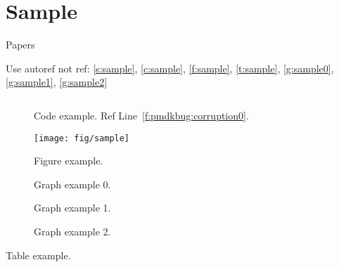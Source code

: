 \section{Sample}
\label{s:sample}

Papers~\cite{logfreeds-david-atc18, whisper-nalli-asplos17}

Use autoref not ref: \autoref{s:sample}, \autoref{c:sample},
\autoref{f:sample}, \autoref{t:sample}, \autoref{g:sample0},
\autoref{g:sample1}, \autoref{g:sample2}

\begin{figure}[t]
  \noindent
  \centering
  \inputminted[xleftmargin=11pt,fontsize=\scriptsize,linenos,escapeinside=@@]{c}{code/sample.c}
  \caption{
    Code example. Ref Line~\ref{f:pmdkbug:corruption0}.
  }
  \label{c:sample}
\end{figure}

\begin{figure}[t!]
  \centering
  \texttt{[image: fig/sample]}
  \caption{Figure example. }
  \label{f:sample}
\end{figure}

\begin{figure*}
  \centering
  
  \caption{
    Graph example 0.
  }
  \label{g:sample0}
\end{figure*}

\begin{figure}
  \centering
  
  \caption{
    Graph example 1.
  }
  \label{g:sample1}
\end{figure}

\begin{figure}
  \centering
  
  \caption{
    Graph example 2.
  }
  \label{g:sample2}
\end{figure}

\begin{table}[t]
  \centering
  \footnotesize
  
  \caption{
    Table example.
  }
  \label{t:sample}
\end{table}
